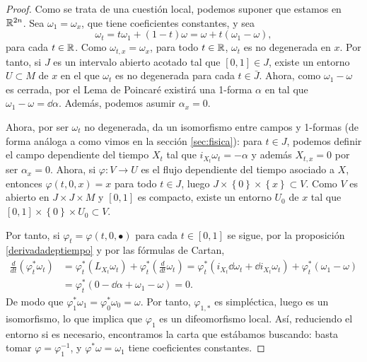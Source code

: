 \begin{proof}
  Como se trata de una cuestión local, podemos suponer que estamos en $\mathbb{R}^{2n}$.
  Sea $\omega_1=\omega_x$, que tiene coeficientes constantes, y sea
  \begin{equation*}
    \omega_t=t\omega_1 + (1-t) \omega = \omega + t(\omega_1-\omega),
  \end{equation*}
  para cada $t\in \mathbb{R}$. Como $\omega_{t,x}=\omega_x$, para todo $t \in \mathbb{R}$, $\omega_t$ es no degenerada en $x$. Por tanto, si $J$ es un intervalo abierto acotado tal que $[0,1]\in J$, existe un entorno $U \subset M$ de $x$ en el que $\omega_t$ es no degenerada para cada $t\in \bar{J}$.
  Ahora, como $\omega_1-\omega$ es cerrada, por el Lema de Poincaré existirá una 1-forma $\alpha$ en tal que $\omega_1-\omega=\dd \alpha$. Además, podemos asumir $\alpha_x=0$.

  Ahora, por ser $\omega_t$ no degenerada, da un isomorfismo entre campos y 1-formas (de forma análoga a como vimos en la sección \ref{sec:fisica}): para $t \in J$, podemos definir el campo dependiente del tiempo $X_t$ tal que $i_{X_t}\omega_t= - \alpha$ y además $X_{t,x}=0$ por ser $\alpha_x=0$. Ahora, si $\varphi:V\rightarrow U$ es el flujo dependiente del tiempo asociado a $X$, entonces $\varphi(t,0,x)=x$ para todo $t\in J$, luego $J\times \left\{ 0 \right\}\times \left\{ x \right\} \subset V$. Como $V$ es abierto en $J\times J\times M$ y $[0,1]$ es compacto, existe un entorno $U_0$ de $x$  tal que $[0,1]\times \left\{ 0 \right\}\times U_0 \subset V$. 
  
  Por tanto, si $\varphi_t = \varphi(t,0,\bullet)$ para cada $t\in [0,1]$ se sigue, por la proposición \ref{derivadadeptiempo} y por las fórmulas de Cartan,
  \begin{align*}
    \frac{d}{dt}(\varphi_t^*\omega_t) & = \varphi_t^* (L_{X_t}\omega_t) + \varphi_t^* \left( \frac{d}{dt}\omega_t \right) = \varphi_t^* (i_{X_t}\dd \omega_t+\dd i_{X_t}\omega_t)+\varphi_t^*(\omega_1-\omega) \\
    & = \varphi_t^*(0-\dd \alpha + \omega_1 - \omega) = 0.
  \end{align*}
  De modo que $\varphi_1^*\omega_1=\varphi_0^*\omega_0=\omega$. Por tanto, $\varphi_{1,*}$ es simpléctica, luego es un isomorfismo, lo que implica que $\varphi_1$ es un difeomorfismo local. Así, reduciendo el entorno si es necesario, encontramos la carta que estábamos buscando: basta tomar $\varphi=\varphi_1^{-1}$, y $\varphi^*\omega=\omega_1$ tiene coeficientes constantes.
\end{proof}

